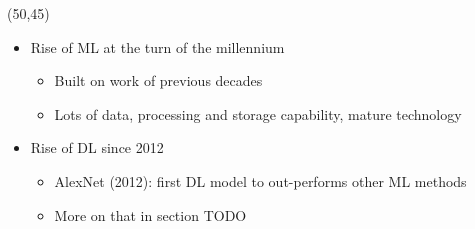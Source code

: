 \begin{frame}
  \begin{textblock}{45}(50,45)
    \begin{itemize}
    \item<7-> Rise of \ac{ML} at the turn of the millennium
      \begin{itemize}
      \item Built on work of previous decades
      \item Lots of data, processing and storage capability, mature technology
      \end{itemize}
    \item<8-> Rise of \acl{DL} since 2012
      \begin{itemize}
      \item AlexNet (2012): first \ac{DL} model to out-performs other \ac{ML}
        methods
      \item More on that in section TODO
      \end{itemize}
    \end{itemize}
  \end{textblock}
\end{frame}


